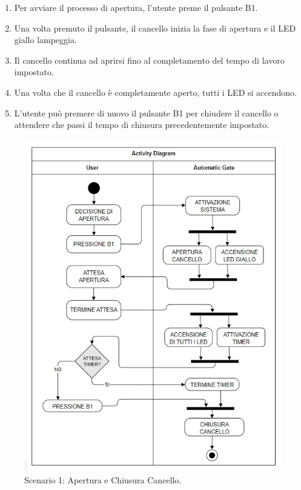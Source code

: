 \documentclass[12pt]{article}
\begin{document}
\begin{enumerate}
    \item Per avviare il processo di apertura, l’utente preme il pulsante B1.
    \item Una volta premuto il pulsante, il cancello inizia la fase di apertura e il LED giallo lampeggia.
    \item Il cancello continua ad aprirsi fino al completamento del tempo di lavoro impostato.
    \item Una volta che il cancello è completamente aperto, tutti i LED si accendono.
    \item L'utente può premere di nuovo il pulsante B1 per chiudere il cancello o attendere che passi il tempo di chiusura precedentemente impostato.
\end{enumerate}

\begin{figure}[H]
    \centering
    \includegraphics[width = 0.7 \textwidth ]{Scenario_1.jpg}
    \caption{Scenario 1: Apertura e Chiusura Cancello.}
    
\end{figure}
\end{document}
